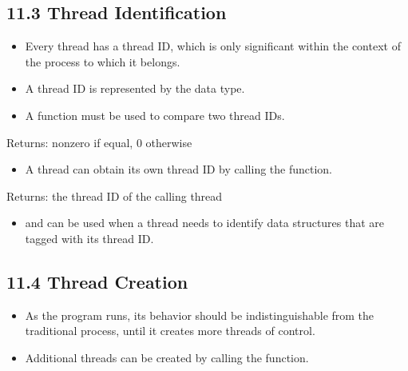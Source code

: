 \documentclass[]{article}
\begin{document}
\subsection*{11.3 Thread Identification}
\begin{itemize}
\item Every thread has a thread ID, which is only significant within the context
of the process to which it belongs.
\item A thread ID is represented by the  data type.
\item A function must be used to compare two thread IDs.
\end{itemize}



Returns: nonzero if equal, 0 otherwise

\begin{itemize}
\item A thread can obtain its own thread ID by calling the 
function.
\end{itemize}



Returns: the thread ID of the calling thread

\begin{itemize}
\item {} and  can be used when a thread
needs to identify data structures that are tagged with its thread ID.
\end{itemize}

\subsection*{11.4 Thread Creation}
\begin{itemize}
\item As the program runs, its behavior should be indistinguishable from the
traditional process, until it creates more threads of control.
\item Additional threads can be created by calling the 
function.
\end{itemize}


\end{document}
